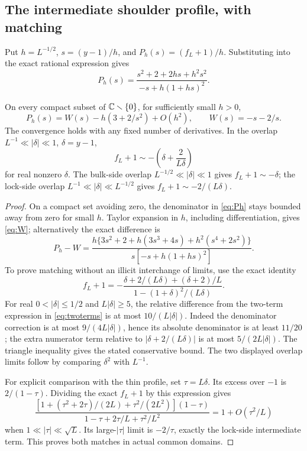 \subsection{The intermediate shoulder profile, with matching}
Put \(h=L^{-1/2}\), \(s=(y-1)/h\), and \(P_h(s)=(f_L+1)/h\). Substituting into the exact rational expression gives
\begin{equation}\label{eq:Ph}
P_h(s)=\frac{s^2+2+2hs+h^2s^2}{-s+h(1+hs)^2}.
\end{equation}
\begin{theorem}\label{thm:matching}
On every compact subset of \(\mathbb C\smallsetminus\{0\}\), for sufficiently small \(h>0\),
\begin{equation}\label{eq:W}
P_h(s)=W(s)-h(3+2/s^2)+O(h^2),\qquad
W(s)=-s-2/s.
\end{equation}
The convergence holds with any fixed number of derivatives. In the overlap
\(L^{-1}\ll|\delta|\ll1\), \(\delta=y-1\),
\begin{equation}\label{eq:twoterms}
f_L+1\sim-\left(\delta+\frac2{L\delta}\right)
\end{equation}
for real nonzero \(\delta\). The bulk-side overlap \(L^{-1/2}\ll|\delta|\ll1\) gives \(f_L+1\sim-\delta\); the lock-side overlap \(L^{-1}\ll|\delta|\ll L^{-1/2}\) gives \(f_L+1\sim-2/(L\delta)\).
\end{theorem}
\begin{proof}
On a compact set avoiding zero, the denominator in \eqref{eq:Ph} stays bounded away from zero for small \(h\). Taylor expansion in \(h\), including differentiation, gives \eqref{eq:W}; alternatively the exact difference is
\[
P_h-W=
\frac{h\{3s^2+2+h(3s^3+4s)+h^2(s^4+2s^2)\}}
{s[-s+h(1+hs)^2]}.
\]
To prove matching without an illicit interchange of limits, use the exact identity
\begin{equation}\label{eq:deltaexact}
f_L+1=-\frac{\delta+2/(L\delta)+(\delta+2)/L}
{1-(1+\delta)^2/(L\delta)}.
\end{equation}
For real \(0<|\delta|\le1/2\) and \(L|\delta|\ge5\), the relative difference from the two-term expression in \eqref{eq:twoterms} is at most \(10/(L|\delta|)\). Indeed the denominator correction is at most \(9/(4L|\delta|)\), hence its absolute denominator is at least \(11/20\); the extra numerator term relative to \(|\delta+2/(L\delta)|\) is at most \(5/(2L|\delta|)\). The triangle inequality gives the stated conservative bound. The two displayed overlap limits follow by comparing \(\delta^2\) with \(L^{-1}\).

For explicit comparison with the thin profile, set \(\tau=L\delta\). Its excess over \(-1\) is \(2/(1-\tau)\). Dividing the exact \(f_L+1\) by this expression gives
\[
\frac{[1+(\tau^2+2\tau)/(2L)+\tau^2/(2L^2)](1-\tau)}
{1-\tau+2\tau/L+\tau^2/L^2}=1+O(\tau^2/L)
\]
when \(1\ll|\tau|\ll\sqrt L\). Its large-\(|\tau|\) limit is \(-2/\tau\), exactly the lock-side intermediate term. This proves both matches in actual common domains.
\end{proof}

